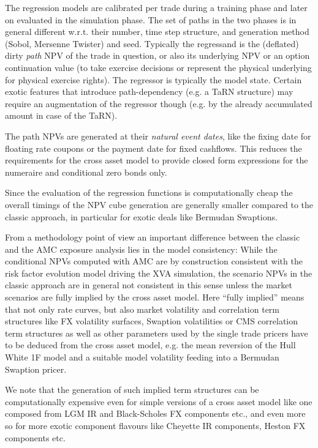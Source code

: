 The regression models are calibrated per trade during a training phase and later on evaluated in the simulation
phase. The set of paths in the two phases is in general different w.r.t. their number, time step structure, and
generation method (Sobol, Mersenne Twister) and seed. Typically the regressand is the (deflated) dirty {\em path} NPV of
the trade in question, or also its underlying NPV or an option continuation value (to take exercise decisions or
represent the physical underlying for physical exercise rights). The regressor is typically the model state. Certain
exotic features that introduce path-dependency (e.g. a TaRN structure) may require an augmentation of the regressor
though (e.g. by the already accumulated amount in case of the TaRN).

The path NPVs are generated at their {\em natural event dates}, like the fixing date for floating rate coupons or the
payment date for fixed cashflows. This reduces the requirements for the cross asset model to provide closed form
expressions for the numeraire and conditional zero bonds only.

Since the evaluation of the regression functions is computationally cheap the overall timings of the NPV cube generation
are generally smaller compared to the classic approach, in particular for exotic deals like Bermudan Swaptions.

From a methodology point of view an important difference between the classic and the AMC exposure analysis lies in the
model consistency: While the conditional NPVs computed with AMC are by construction consistent with the risk factor
evolution model driving the XVA simulation, the scenario NPVs in the classic approach are in general not consistent in
this sense unless the market scenarios are fully implied by the cross asset model. Here ``fully implied'' means that not
only rate curves, but also market volatility and correlation term structures like FX volatility surfaces, Swaption
volatilities or CMS correlation term structures as well as other parameters used by the single trade pricers have to be
deduced from the cross asset model, e.g. the mean reversion of the Hull White 1F model and a suitable model volatility
feeding into a Bermudan Swaption pricer.

We note that the generation of such implied term structures can be computationally expensive even for simple versions of
a cross asset model like one composed from LGM IR and Black-Scholes FX components etc., and even more so for more exotic
component flavours like Cheyette IR components, Heston FX components etc.

